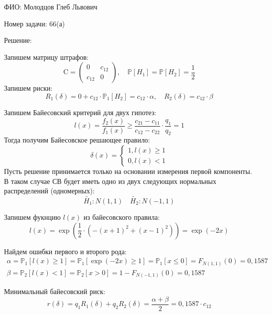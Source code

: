 \documentclass[14pt]{extarticle}
\begin{document}
ФИО: Молодцов Глеб Львович

\vspace{10pt}

Номер задачи: 66(а)

\vspace{10pt}

Решение:

\vspace{10pt}

Запишем матрицу штрафов:
$$
\text{C}=\left(\begin{array}{ll}
0 & c_{12}  \\
c_{12}  & 0
\end{array}\right), \quad \mathbb{P}\left[H_1\right]=\mathbb{P}\left[H_2\right]=\frac{1}{2}
$$
Запишем риски:
$$
R_1(\delta)=0+c_{12}  \cdot \mathbb{P}_1\left[H_2\right]=c_{12}  \cdot \alpha, \quad R_2(\delta)=c_{12}  \cdot \beta
$$

Запишем Байесовский критерий для двух гипотез:
$$
l(x)=\frac{f_2(x)}{f_1(x)} \geqslant \frac{c_{21}-c_{11}}{c_{12}-c_{22}} \cdot \frac{q_1}{q_2}=1
$$
Тогда получим Байесовское решающее правило:
$$
\delta(x)=\left\{\begin{array}{l}
1, l(x) \geqslant 1 \\
0, l(x)<1
\end{array}\right.
$$
Пусть решение принимается только на основании измерения первой компоненты. В таком случае СВ будет иметь одно из двух следующих нормальных распределений (одномерных):
$$
\tilde{H_1}: N(1,1) \quad \tilde{H_2}: N(-1,1)
$$

Запишем фукнцию $l(x)$ из байесовского правила:
$$
l(x)=\exp \left(\frac{1}{2} \cdot\left(-(x+1)^2+(x-1)^2\right)\right)=\exp (-2x)
$$

Найдем ошибки первого и второго рода:
\begin{gather*}
\alpha=\mathbb{P}_1[l(x) \geqslant 1]=\mathbb{P}_1[\exp (-2 x) \geqslant 1]=\mathbb{P}_1[x \leqslant 0]=F_{N(1,1)}(0)=0,1587 \\
\beta=\mathbb{P}_2[l(x)<1]=\mathbb{P}_2[x>0]=1-F_{N(-1,1)}(0)=0,1587
\end{gather*}

Минимальный байесовский риск:
$$
r(\delta)=q_1 R_1(\delta)+q_2 R_2(\delta)=\frac{\alpha+\beta}{2}=0,1587 \cdot c_{12} 
$$
\end{document}
